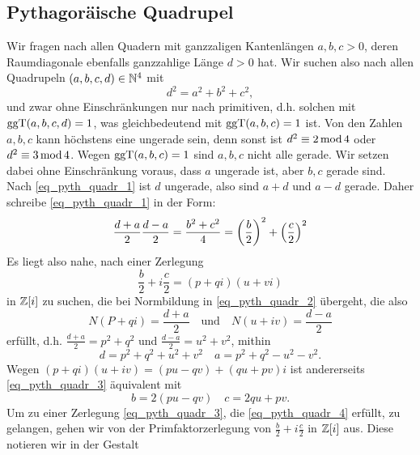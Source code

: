 \subsection{Pythagoräische Quadrupel}
	Wir fragen nach allen Quadern mit ganzzaligen Kantenlängen $a,b,c > 0$, deren Raumdiagonale ebenfalls ganzzahlige Länge $d > 0$ hat. Wir suchen also nach allen Quadrupeln $(a,b,c,d) \in \NN^4$ mit
	\begin{equation}
		d^2 = a^2+b^2+c^2, \label{eq_pyth_quadr_1}
	\end{equation}
	und zwar ohne Einschränkungen nur nach primitiven, d.h. solchen mit $\ggT(a,b,c,d) = 1$, was gleichbedeutend mit $\ggT(a,b,c) = 1$ ist. Von den Zahlen $a,b,c$ kann höchstens eine ungerade sein, denn sonst ist $d^2 \kon 2 \modu 4$ oder $d^2 \kon 3 \modu 4$. Wegen $\ggT(a,b,c) = 1$ sind $a,b,c$ nicht alle gerade. Wir setzen dabei ohne Einschränkung voraus, dass $a$ ungerade ist, aber $b,c$ gerade sind. Nach \eqref{eq_pyth_quadr_1} ist $d$ ungerade, also sind $a+d$ und $a-d$ gerade. Daher schreibe \eqref{eq_pyth_quadr_1} in der Form:
	\begin{equation}
		\frac{d+a}{2} \frac{d-a}{2} = \frac{b^2+c^2}{4} = \enbrace*{\frac{b}{2}}^2 + \enbrace*{\frac{c}{2}}^2 \label{eq_pyth_quadr_2}
	\end{equation}
	Es liegt also nahe, nach einer Zerlegung
	\begin{equation}
		\frac{b}{2} + i \frac{c}{2} = (p+qi)(u+vi) \label{eq_pyth_quadr_3}
	\end{equation}
	in $\ZZ[i]$ zu suchen, die bei Normbildung in \eqref{eq_pyth_quadr_2} übergeht, die also
	\begin{equation}
		N(P+qi) = \frac{d+a}{2} \quad \text{und} \quad N(u+iv) = \frac{d-a}{2} \label{eq_pyth_quadr_4}
	\end{equation}
	erfüllt, d.h. $\frac{d+a}{2} = p^2 + q^2$ und $\frac{d-a}{2} = u^2+v^2$, mithin
	\begin{equation}
		d = p^2 + q^2 + u^2 + v^2 \quad a = p^2+q^2-u^2-v^2 \label{eq_pyth_quadr_5}.
	\end{equation}
	Wegen $(p+qi)(u+iv) = (pu-qv) + (qu+pv)i$ ist andererseits \eqref{eq_pyth_quadr_3} äquivalent mit
	\begin{equation}
		b = 2(pu-qv) \quad c = 2qu + pv. \label{eq_pyth_quadr_6}
	\end{equation}
	Um zu einer Zerlegung \eqref{eq_pyth_quadr_3}, die \eqref{eq_pyth_quadr_4} erfüllt, zu gelangen, gehen wir von der Primfaktorzerlegung von $\frac{b}{2} + i \frac{c}{2}$ in $\ZZ[i]$ aus. Diese notieren wir in der Gestalt
